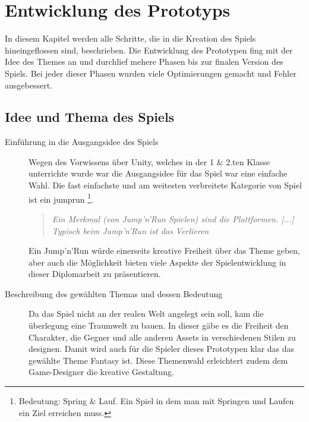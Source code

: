 \pagebreak
\chapter{Entwicklung des Prototyps}

In diesem Kapitel werden alle Schritte, die in die Kreation des Spiels hineingeflossen sind, beschrieben. Die Entwicklung des Prototypen fing mit der Idee des Themes an und durchlief mehere Phasen bis zur finalen Version des Spiels. Bei jeder dieser Phasen wurden viele Optimierungen gemacht und Fehler ausgebessert. 


\section{Idee und Thema des Spiels}


\begin{description}
  \item [Einführung in die Ausgangsidee des Spiels]
    Wegen des Vorwissens über Unity, welches in der 1 \& 2.ten Klasse unterrichte wurde war die Ausgangsidee für das Spiel war eine einfache Wahl. Die fast einfachste und am weitesten verbreitete Kategorie von Spiel ist ein \gls{jumprun} \footnote[1]{Bedeutung: Spring \& Lauf. Ein Spiel in dem man mit Springen und Laufen ein Ziel erreichen muss.}. 

    \begin{quote}
      \emph{\glqq Ein Merkmal (von Jump'n'Run Spielen) sind die Plattformen. [...] Typisch beim Jump'n'Run ist das Verlieren\grqq}~\cite[1:42-1:57]{ArtOfGaming}
    \end{quote}
    
    Ein Jump'n'Run würde einerseits kreative Freiheit über das Theme geben, aber auch die Möglichkeit bieten viele Aspekte der Spielentwicklung in dieser Diplomarbeit zu präsentieren.

  \item [Beschreibung des gewählten Themas und dessen Bedeutung]
    Da das Spiel nicht an der realen Welt angelegt sein soll, kam die überlegung eine Traumwelt zu bauen. In dieser gäbe es die Freiheit den Charakter, die Gegner und alle anderen Assets in verschiedenen Stilen zu designen. Damit wird auch für die Spieler dieses Prototypen klar das das gewählte Theme Fantasy ist. Diese Themenwahl erleichtert zudem dem Game-Designer die kreative Gestaltung.

  
\end{description}




\pagebreak

